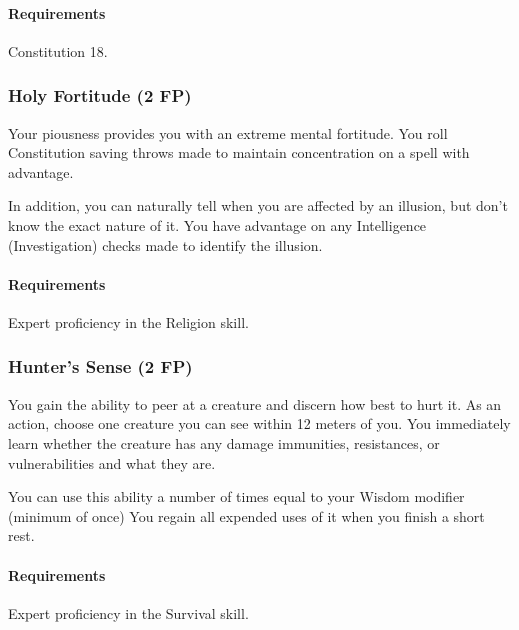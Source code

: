     \paragraph{Requirements} Constitution 18.
\subsubsection{Holy Fortitude (2 FP)} \label{feat::holyfortitude}
    Your piousness provides you with an extreme mental fortitude.
    You roll Constitution saving throws made to maintain concentration on a spell with advantage.

    In addition, you can naturally tell when you are affected by an illusion, but don't know the exact nature of it.
    You have advantage on any Intelligence (Investigation) checks made to identify the illusion.
    \paragraph{Requirements} Expert proficiency in the Religion skill.
\subsubsection{Hunter's Sense (2 FP)} \label{feat::hunterssense}
    You gain the ability to peer at a creature and discern how best to hurt it.
    As an action, choose one creature you can see within 12 meters of you.
    You immediately learn whether the creature has any damage immunities, resistances, or vulnerabilities and what they are.

    You can use this ability a number of times equal to your Wisdom modifier (minimum of once)
     You regain all expended uses of it when you finish a short rest.
    \paragraph{Requirements} Expert proficiency in the Survival skill.
